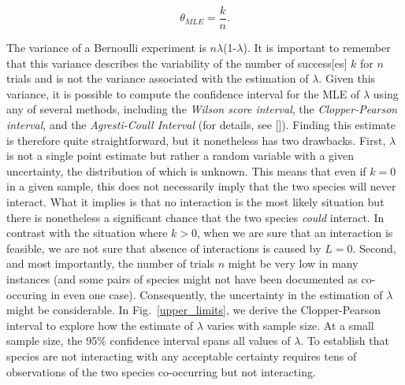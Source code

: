 \documentclass[12pt]{article}
\begin{document}
      \begin{equation}
        \theta_{MLE} = \frac{k}{n}  .
        \label{theta_MLE}
      \end{equation}

  The variance of a Bernoulli experiment is $n\lambda$(1-$\lambda$). It is important to remember that this variance describes the variability of the number of success[es] $k$ for $n$ trials and is not the variance associated with the estimation of $\lambda$.
  Given this variance, it is possible to compute the confidence interval for the MLE of $\lambda$ using any of several methods, including the \emph{Wilson score interval}, the \emph{Clopper-Pearson interval}, and the \emph{Agresti-Coull Interval} (for details, see [\citealp{}]). Finding this estimate is therefore quite straightforward, but it nonetheless has two drawbacks. First, $\lambda$ is not a single point estimate but rather a random variable with a given uncertainty, the distribution of which is unknown. This means that even if $k = 0$ in a given sample, this does not necessarily imply that the two species will never interact. What it implies is that no interaction is the most likely situation but there is nonetheless a significant chance that the two species \emph{could} interact. In contrast with the situation where $k>0$, when we are sure that an interaction is feasible, 
  we are not sure that absence of interactions is caused by $L=0$. Second, and most importantly, the number of trials $n$ might be very low in many instances (and some pairs of species might not have been documented as co-occuring in even one case). Consequently, the uncertainty in the estimation of $\lambda$ might be considerable. In Fig.~\ref{upper_limits}, we derive the Clopper-Pearson interval to explore how the estimate of $\lambda$ varies with sample size. At a small sample size, the 95\% confidence interval spans all values of $\lambda$. To establish that species are not interacting with any acceptable certainty requires tens of observations of the two species co-occurring but not interacting.

\end{document}
